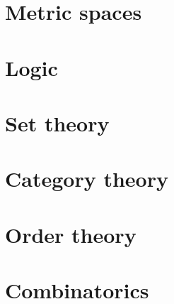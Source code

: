 \documentclass{scrartcl}
\begin{document}
\section{Metric spaces}\label{sec:metric_spaces}





\section{Logic}\label{sec:logic}





\section{Set theory}\label{sec:set_theory}





\section{Category theory}\label{sec:category_theory}





\section{Order theory}\label{sec:order_theory}




\section{Combinatorics}\label{sec:combinatorics}


\printindex
\printbibliography
\end{document}
